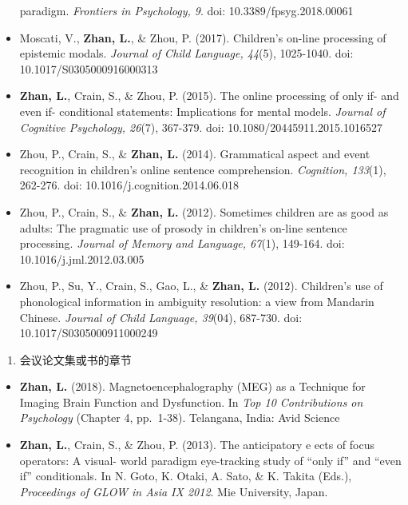 \documentclass[12pt,]{article}
\providecommand{\tightlist}{%
  \setlength{\itemsep}{0pt}\setlength{\parskip}{0pt}}
\begin{document}
\begin{itemize}
  paradigm. \emph{Frontiers in Psychology, 9}. doi:
  10.3389/fpsyg.2018.00061
  \href{https://www.frontiersin.org/articles/10.3389/fpsyg.2018.00061/full}{
  \faFilePdf[regular] }
\item
  Moscati, V., \textbf{Zhan, L.}, \& Zhou, P. (2017). Children's on-line
  processing of epistemic modals. \emph{Journal of Child Language,
  44}(5), 1025-1040. doi: 10.1017/S0305000916000313
  \href{https://publications.likan.info/Periodicals/JChildLang2016.pdf}{
  \faFilePdf[regular] }
\item
  \textbf{Zhan, L.}, Crain, S., \& Zhou, P. (2015). The online
  processing of only if- and even if- conditional statements:
  Implications for mental models. \emph{Journal of Cognitive Psychology,
  26}(7), 367-379. doi: 10.1080/20445911.2015.1016527
  \href{https://publications.likan.info/Periodicals/JCognPsychol2015.pdf}{
  \faFilePdf[regular] }
\item
  Zhou, P., Crain, S., \& \textbf{Zhan, L.} (2014). Grammatical aspect
  and event recognition in children's online sentence comprehension.
  \emph{Cognition, 133}(1), 262-276. doi:
  10.1016/j.cognition.2014.06.018
  \href{http://publications.likan.info/Periodicals/Cognition2014.pdf}{
  \faFilePdf[regular] }
\item
  Zhou, P., Crain, S., \& \textbf{Zhan, L.} (2012). Sometimes children
  are as good as adults: The pragmatic use of prosody in children's
  on-line sentence processing. \emph{Journal of Memory and Language,
  67}(1), 149-164. doi: 10.1016/j.jml.2012.03.005
  \href{https://publications.likan.info/Periodicals/JMemLang2012.pdf}{
  \faFilePdf[regular] }
\item
  Zhou, P., Su, Y., Crain, S., Gao, L., \& \textbf{Zhan, L.} (2012).
  Children's use of phonological information in ambiguity resolution: a
  view from Mandarin Chinese. \emph{Journal of Child Language, 39}(04),
  687-730. doi: 10.1017/S0305000911000249
  \href{https://publications.likan.info/Periodicals/JChildLang2012.pdf}{
  \faFilePdf[regular] }
\end{itemize}

\begin{enumerate}
\def\labelenumi{\arabic{enumi}.}
\setcounter{enumi}{2}
\tightlist
\item
  会议论文集或书的章节
\end{enumerate}

\begin{itemize}
\item
  \textbf{Zhan, L.} (2018). Magnetoencephalography (MEG) as a Technique
  for Imaging Brain Function and Dysfunction. In \emph{Top 10
  Contributions on Psychology} (Chapter 4, pp.~1-38). Telangana, India:
  Avid Science
\item
  \textbf{Zhan, L.}, Crain, S., \& Zhou, P. (2013). The anticipatory e
  ects of focus operators: A visual- world paradigm eye-tracking study
  of ``only if'' and ``even if'' conditionals. In N. Goto, K. Otaki, A.
  Sato, \& K. Takita (Eds.), \emph{Proceedings of GLOW in Asia IX 2012}.
  Mie University, Japan.
\end{itemize}
\end{document}
